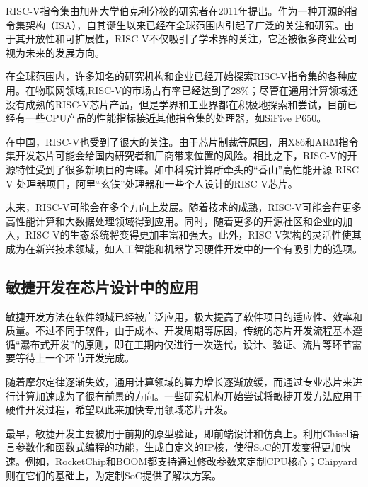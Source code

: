 RISC-V指令集由加州大学伯克利分校的研究者在2011年提出\cite{watermanRISCVInstructionSet2011}。作为一种开源的指令集架构（ISA），自其诞生以来已经在全球范围内引起了广泛的关注和研究。由于其开放性和可扩展性，RISC-V不仅吸引了学术界的关注，它还被很多商业公司视为未来的发展方向。

在全球范围内，许多知名的研究机构和企业已经开始探索RISC-V指令集的各种应用。在物联网领域,RISC-V的市场占有率已经达到了28\%；尽管在通用计算领域还没有成熟的RISC-V芯片产品，但是学界和工业界都在积极地探索和尝试，目前已经有一些CPU产品的性能指标接近其他指令集的处理器，如SiFive P650。

在中国，RISC-V也受到了很大的关注。由于芯片制裁等原因，用X86和ARM指令集开发芯片可能会给国内研究者和厂商带来位置的风险。相比之下，RISC-V的开源特性受到了很多新项目的青睐。如中科院计算所牵头的“香山”高性能开源 RISC-V 处理器项目，阿里“玄铁”处理器和一些个人设计的RISC-V芯片\cite{XieJiYuRISCDeSiFaSheChaoBiaoLiangChuLiQiGuanJianJiaGouSheJi2024,JiaRISCVChuLiQiHeSheJiYouHuaYuKuoZhanZhiLingJiShiXianYanJiu2023}。

未来，RISC-V可能会在多个方向上发展。随着技术的成熟，RISC-V可能会在更多高性能计算和大数据处理领域得到应用。同时，随着更多的开源社区和企业的加入，RISC-V的生态系统将变得更加丰富和强大。此外，RISC-V架构的灵活性使其成为在新兴技术领域，如人工智能和机器学习硬件开发中的一个有吸引力的选项\cite{newsRISCVFutureMachine}。

\subsection{敏捷开发在芯片设计中的应用}

敏捷开发方法在软件领域已经被广泛应用，极大提高了软件项目的适应性、效率和质量。不过不同于软件，由于成本、开发周期等原因，传统的芯片开发流程基本遵循“瀑布式开发”的原则，即在工期内仅进行一次迭代，设计、验证、流片等环节需要等待上一个环节开发完成。

随着摩尔定律逐渐失效，通用计算领域的算力增长逐渐放缓，而通过专业芯片来进行计算加速成为了很有前景的方向。一些研究机构开始尝试将敏捷开发方法应用于硬件开发过程\cite{leeAgileApproachBuilding2016,baoAgileOpenSourceHardware2020}，希望以此来加快专用领域芯片开发。

最早，敏捷开发主要被用于前期的原型验证，即前端设计和仿真上。利用Chisel语言\cite{bachrachChiselConstructingHardware2012}参数化和函数式编程的功能，生成自定义的IP核，使得SoC的开发变得更加快速。例如，RocketChip\cite{ChipsallianceRocketchip2023}和BOOM\cite{zhaoSonicBOOM3rdGeneration}都支持通过修改参数来定制CPU核心；Chipyard\cite{amidChipyardIntegratedDesign2020} 则在它们的基础上，为定制SoC提供了解决方案。

